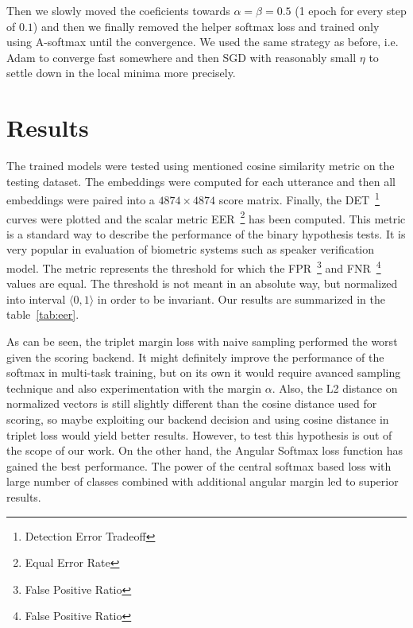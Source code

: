 \medskip
\noindent
Then we slowly moved the coeficients towards $ \alpha = \beta = 0.5 $ (1 epoch for every step of $ 0.1 $) and then we finally removed the helper softmax loss and trained only using A-softmax until the convergence. We used the same strategy as before, i.e. Adam to converge fast somewhere and then SGD with reasonably small $ \eta $ to settle down in the local minima more precisely.

\section{Results}

The trained models were tested using mentioned cosine similarity metric on the testing dataset. The embeddings were computed for each utterance and then all embeddings were paired into a $ 4874 \times 4874 $ score matrix. Finally, the DET~\footnote{Detection Error Tradeoff} curves were plotted and the scalar metric EER~\footnote{Equal Error Rate} has been computed. This metric is a standard way to describe the performance of the binary hypothesis tests. It is very popular in evaluation of biometric systems such as speaker verification model. The metric represents the threshold for which the FPR~\footnote{False Positive Ratio} and FNR~\footnote{False Positive Ratio} values are equal. The threshold is not meant in an absolute way, but normalized into interval $ \langle 0, 1 \rangle $ in order to be invariant. Our results are summarized in the table~\ref{tab:eer}.



\medskip
\noindent
As can be seen, the triplet margin loss with naive sampling performed the worst given the scoring backend. It might definitely improve the performance of the softmax in multi-task training, but on its own it would require avanced sampling technique and also experimentation with the margin $ \alpha $. Also, the L2 distance on normalized vectors is still slightly different than the cosine distance used for scoring, so maybe exploiting our backend decision and using cosine distance in triplet loss would yield better results. However, to test this hypothesis is out of the scope of our work. On the other hand, the Angular Softmax loss function has gained the best performance. The power of the central softmax based loss with large number of classes combined with additional angular margin led to superior results.

